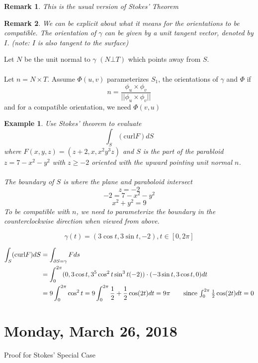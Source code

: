 \documentclass[12pt]{article}
\theoremstyle{plain}
\newtheorem*{remark}{Remark}
\newtheorem{example}[theorem]{Example}
\theoremstyle{definition}
\begin{document}
\begin{remark}
	This is the usual version of Stokes' Theorem
\end{remark}
\begin{remark}
	We can be explicit about what it means for the orientations to be compatible. The orientation of $\gamma$ can be given by a unit tangent vector, denoted by $I$. (note: $I$ is also tangent to the surface)
\end{remark}

Let $N$ be the unit normal to $\gamma$ $(N \bot T)$ which points away from $S$.\\
\\
Let $n = N \times T$. Assume $\Phi (u,v)$ parameterizes $S_1$, the orientations of $\gamma$ and $\Phi$ if
$$n = \frac{\phi_u \times \phi_v}{||\phi_u \times \phi_v||}$$
and for a compatible orientation, we need $\Phi (v,u)$

\begin{example}
	Use Stokes' theorem to evaluate
	$$\int_S (\text{curl} F) dS$$
	where $F(x,y,z)=(z+2, x, x^2 y^3 z)$
	and $S$ is the part of the parabloid $z=7-x^2-y^2$ with $z\geq -2$ oriented with the upward pointing unit normal $n$.\\
	\\
	The boundary of $S$ is where the plane and paraboloid intersect  $$z=-2$$
	$$-2=7-x^2-y^2$$
	$$x^2+y^2 = 9$$
	To be compatible with $n$, we need to parameterize the boundary in the counterclockwise direction when viewed from above.

	$$\gamma (t) = (3\cos t, 3\sin t, -2), t\in [0,2\pi]$$

	\begin{align*}
		\int_S (\text{curl} F) dS &=  \int_{\partial S = \gamma} F ds\\
		&= \int^{2\pi}_0 (0, 3\cos t, 3^5 \cos^2 t \sin^3 t (-2))\cdot (-3\sin t, 3\cos t, 0)dt\\
		&=9 \int^{2\pi}_0 \cos^2 t = 9 \int^{2\pi}_0 \frac{1}{2}+\frac{1}{2}\cos (2t)dt = 9\pi \tag*{since $\int^{2\pi}_0\frac{1}{2}\cos (2t)dt=0$}
	\end{align*}
\end{example}

\newpage

\section{Monday, March 26, 2018}

Proof for Stokes' Special Case
\end{document}
